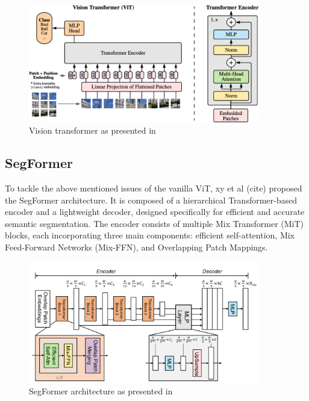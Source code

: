 \begin{figure}[!ht]
    \centering
    \includegraphics[width=0.9\textwidth]{Images/SOTA/vit.png}
    \caption{Vision transformer as presented in }
    \label{fig:vit}
\end{figure}


\subsection{SegFormer}

To tackle the above mentioned issues of the vanilla ViT, xy et al (cite) proposed the SegFormer architecture. It is composed of a hierarchical Transformer-based encoder and a lightweight decoder, designed specifically for efficient and accurate semantic segmentation. The encoder consists of multiple Mix Transformer (MiT) blocks, each incorporating three main components: efficient self-attention, Mix Feed-Forward Networks (Mix-FFN), and Overlapping Patch Mappings.

\begin{figure}[!ht]
    \centering
    \includegraphics[width=0.9\textwidth]{Images/SOTA/SegFormer.png}
    \caption{SegFormer architecture as presented in}
    \label{fig:segformer}
\end{figure}

